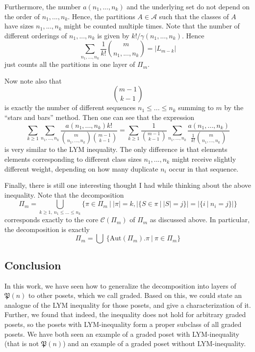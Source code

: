 \documentclass{scrartcl}
\newcommand{\powerset}{\mathfrak{P}}
\theoremstyle{definition}
\begin{document}
Furthermore, the number $a(n_1, ..., n_k)$ and the underlying set do not depend on the order of $n_1, ..., n_k$.
Hence, the partitions $A \in \mathcal{A}$ such that the classes of $A$ have sizes $n_1, ..., n_k$ might be counted multiple times.
Note that the number of different orderings of $n_1, ..., n_k$ is given by $k!/\gamma(n_1, ..., n_k)$.
Hence
\begin{equation*}
    \sum_{n_1, ..., n_k} \frac 1 {k!} {m \choose n_1, ..., n_k} = |L_{m - k}|
\end{equation*}
just counts all the partitions in one layer of $\Pi_m$.

Now note also that
\begin{equation*}
    {m - 1 \choose k - 1}
\end{equation*}
is exactly the number of different sequences $n_1 \leq ... \leq n_k$ summing to $m$ by the ``stars and bars'' method.
Then one can see that the expression
\begin{equation*}    
    \sum_{k \geq 1} \sum_{n_1, ..., n_k} \frac {a(n_1, ..., n_k) k!} {{m \choose n_1, ..., n_k} {m - 1 \choose k - 1}} = \sum_{k \geq 1} \frac 1 {{m - 1 \choose k - 1}} \sum_{n_1, ..., n_k} \frac {a(n_1, ..., n_k)} {\frac 1 {k!} {m \choose n_1, ..., n_k}}
\end{equation*}
is very similar to the LYM inequality.
The only difference is that elements elements corresponding to different class sizes $n_1, ..., n_k$ might receive slightly different weight, depending on how many duplicate $n_i$ occur in that sequence.

Finally, there is still one interesting thought I had while thinking about the above inequality.
Note that the decomposition
\begin{equation*}
    \Pi_m = \bigcup_{k \geq 1, \ n_1 \leq ... \leq n_k} \bigl\{ \pi \in \Pi_m \ | \ |\pi| = k, |\{ S \in \pi \ | \ |S| = j \}| = |\{ i \ | \ n_i = j \}| \bigr\}
\end{equation*}
corresponds exactly to the core $\mathcal{C}(\Pi_m)$ of $\Pi_m$ as discussed above.
In particular, the decomposition is exactly
\begin{equation*}
    \Pi_m = \bigcup \ \{ \mathrm{Aut}(\Pi_m).\pi \ | \ \pi \in \Pi_m \}
\end{equation*}

\subsection*{Conclusion}
In this work, we have seen how to generalize the decomposition into layers of $\powerset(n)$ to other posets, which we call graded.
Based on this, we could state an analogue of the LYM inequality for those posets, and give a characterization of it.
Further, we found that indeed, the inequality does not hold for arbitrary graded posets, so the posets with LYM-inequality form a proper subclass of all graded posets.
We have both seen an example of a graded poset with LYM-inequality (that is not $\powerset(n)$) and an example of a graded poset without LYM-inequality.
\end{document}
